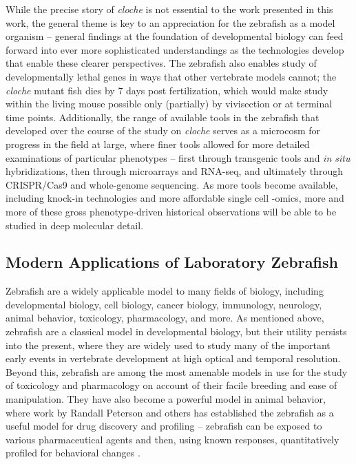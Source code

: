 While the precise story of \textit{cloche} is not essential to the work presented in this work, the general theme is key to an appreciation for the zebrafish as a model organism -- general findings at the foundation of developmental biology can feed forward into ever more sophisticated understandings as the technologies develop that enable these clearer perspectives. The zebrafish also enables study of developmentally lethal genes in ways that other vertebrate models cannot; the \textit{cloche} mutant fish dies by 7 days post fertilization, which would make study within the living mouse possible only (partially) by vivisection or at terminal time points. Additionally, the range of available tools in the zebrafish that developed over the course of the study on \textit{cloche} serves as a microcosm for progress in the field at large, where finer tools allowed for more detailed examinations of particular phenotypes -- first through transgenic tools and \textit{in situ} hybridizations, then through microarrays and RNA-seq, and ultimately through CRISPR/Cas9 and whole-genome sequencing. As more tools become available, including knock-in technologies and more affordable single cell -omics, more and more of these gross phenotype-driven historical observations will be able to be studied in deep molecular detail. 

\subsection{Modern Applications of Laboratory Zebrafish}

Zebrafish are a widely applicable model to many fields of biology, including developmental biology, cell biology, cancer biology, immunology, neurology, animal behavior, toxicology, pharmacology, and more. As mentioned above, zebrafish are a classical model in developmental biology, but their utility persists into the present, where they are widely used to study many of the important early events in vertebrate development at high optical and temporal resolution. Beyond this, zebrafish are among the most amenable models in use for the study of toxicology and pharmacology on account of their facile breeding and ease of manipulation. They have also become a powerful model in animal behavior, where work by Randall Peterson and others has established the zebrafish as a useful model for drug discovery and profiling -- zebrafish can be exposed to various pharmaceutical agents and then, using known responses, quantitatively profiled for behavioral changes \citep{MacRae2003, MacRae2015, Peterson2012, Rihel2010, Kokel2010, Kokel2011, Bruni2016, Zon2005}. 

